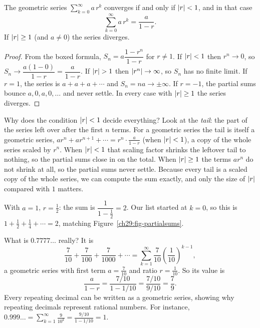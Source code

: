 \begin{theorem}
\label{ch29:thm-geometric}
The geometric series $\sum_{k=0}^{\infty} a\, r^k$ converges if and only if $\lvert r\rvert < 1$, and in that case
\[
\sum_{k=0}^{\infty} a\, r^{k} = \frac{a}{1 - r}.
\]
If $\lvert r\rvert \geq 1$ (and $a \neq 0$) the series diverges.
\end{theorem}

\begin{proof}
From the boxed formula, $S_n = a\dfrac{1 - r^n}{1-r}$ for $r \neq 1$. If $\lvert r\rvert < 1$ then $r^n \to 0$, so $S_n \to \dfrac{a(1-0)}{1-r} = \dfrac{a}{1-r}$. If $\lvert r\rvert > 1$ then $\lvert r^n\rvert\to\infty$, so $S_n$ has no finite limit. If $r = 1$, the series is $a + a + a + \cdots$ and $S_n = na \to \pm\infty$. If $r = -1$, the partial sums bounce $a, 0, a, 0, \dots$ and never settle. In every case with $\lvert r\rvert \ge 1$ the series diverges.
\end{proof}

\begin{whybox}
Why does the condition $\lvert r\rvert<1$ decide everything? Look at the \emph{tail}: the part of the series left over after the first $n$ terms. For a geometric series the tail is itself a geometric series, $ar^n + ar^{n+1}+\cdots = r^n \cdot \frac{a}{1-r}$ (when $\lvert r\rvert<1$), a copy of the whole series scaled by $r^n$. When $\lvert r\rvert < 1$ that scaling factor shrinks the leftover tail to nothing, so the partial sums close in on the total. When $\lvert r\rvert \ge 1$ the terms $ar^n$ do not shrink at all, so the partial sums never settle. Because every tail is a scaled copy of the whole series, we can compute the sum exactly, and only the size of $\lvert r\rvert$ compared with $1$ matters.
\end{whybox}

\begin{example}
With $a=1$, $r=\tfrac12$: the sum is $\dfrac{1}{1 - \tfrac12} = 2$. Our list started at $k=0$, so this is $1 + \tfrac12 + \tfrac14 + \cdots = 2$, matching Figure~\ref{ch29:fig-partialsums}.
\end{example}

\begin{example}
What is $0.7777\ldots$ really? It is
\[
\frac{7}{10} + \frac{7}{100} + \frac{7}{1000} + \cdots = \sum_{k=1}^{\infty} \frac{7}{10}\left(\frac{1}{10}\right)^{k-1},
\]
a geometric series with first term $a = \tfrac{7}{10}$ and ratio $r = \tfrac{1}{10}$. So its value is
\[
\frac{a}{1-r} = \frac{7/10}{1 - 1/10} = \frac{7/10}{9/10} = \frac{7}{9}.
\]
Every repeating decimal can be written as a geometric series, showing why repeating decimals represent rational numbers. For instance, $0.999\ldots = \sum_{k=1}^\infty \frac{9}{10^k} = \frac{9/10}{1-1/10}=1$.
\end{example}

